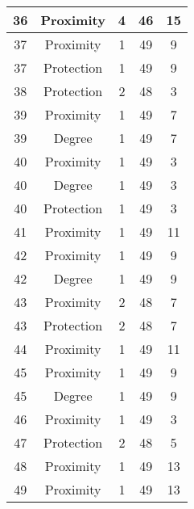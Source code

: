 \documentclass[results.tex]{subfiles}
\begin{document}
\begin{center}
\begin{tabular}{| c || c | c | c | c |}
    \hline
    36 & Proximity & 4 & 46 & 15 \\ 
    \hline
    37 & Proximity & 1 & 49 & 9 \\ 
    \hline
    37 & Protection & 1 & 49 & 9 \\ 
    \hline
    38 & Protection & 2 & 48 & 3 \\ 
    \hline
    39 & Proximity & 1 & 49 & 7 \\ 
    \hline
    39 & Degree & 1 & 49 & 7 \\ 
    \hline
    40 & Proximity & 1 & 49 & 3 \\ 
    \hline
    40 & Degree & 1 & 49 & 3 \\ 
    \hline
    40 & Protection & 1 & 49 & 3 \\ 
    \hline
    41 & Proximity & 1 & 49 & 11 \\ 
    \hline
    42 & Proximity & 1 & 49 & 9 \\ 
    \hline
    42 & Degree & 1 & 49 & 9 \\ 
    \hline
    43 & Proximity & 2 & 48 & 7 \\ 
    \hline
    43 & Protection & 2 & 48 & 7 \\ 
    \hline
    44 & Proximity & 1 & 49 & 11 \\ 
    \hline
    45 & Proximity & 1 & 49 & 9 \\ 
    \hline
    45 & Degree & 1 & 49 & 9 \\ 
    \hline
    46 & Proximity & 1 & 49 & 3 \\ 
    \hline
    47 & Protection & 2 & 48 & 5 \\ 
    \hline
    48 & Proximity & 1 & 49 & 13 \\ 
    \hline
    49 & Proximity & 1 & 49 & 13 \\ 
    \hline   \end{tabular}
\end{center}
\end{document}
